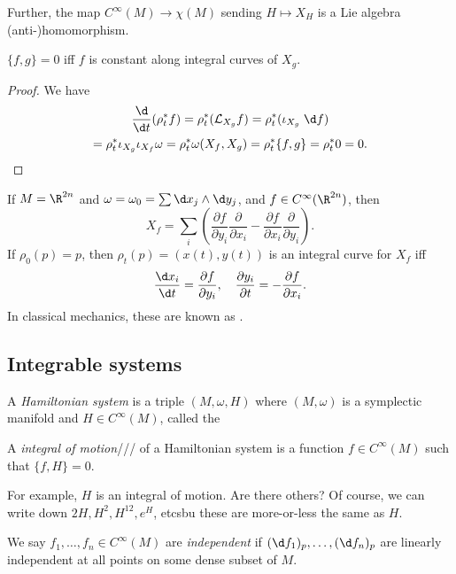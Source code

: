 \documentclass[a4paper]{article}
\begin{document}
Further, the map $C^\infty(M) \to \chi(M)$ sending $H \mapsto X_H$ is a Lie algebra (anti-)homomorphism.

\begin{prop}
  $\{f, g\} = 0$ iff $f$ is constant along integral curves of $X_g$.
\end{prop}

\begin{proof}
  We have
  \begin{multline*}
    \frac{\d}{\d t} (\rho_t^* f) = \rho_t^* (\mathcal{L}_{X_g} f) = \rho_t^* (\iota_{X_g}\;\d f) \\
    = \rho_t^* \iota_{X_g} \iota_{X_f} \omega = \rho_t^* \omega(X_f, X_g) = \rho_t^* \{f, g\} = \rho_t^* 0 = 0.%
  \end{multline*}
\end{proof}

\begin{eg}
  If $M = \R^{2n}$ and $\omega = \omega_0 = \sum \d x_j \wedge \d y_j$, and $f \in C^\infty(\R^{2n})$, then
  \[
    X_f = \sum_i \left(\frac{\partial f}{\partial y_i} \frac{\partial}{\partial x_i} - \frac{\partial f}{\partial x_i} \frac{\partial }{\partial y_i}\right).
  \]
  If $\rho_0(p) = p$, then $\rho_t(p) = (x(t), y(t))$ is an integral curve for $X_f$ iff
  \[
    \frac{\d x_i}{\d t} = \frac{\partial f}{\partial y_i},\quad \frac{\partial y_i}{\partial t} = -\frac{\partial f}{\partial x_i}.
  \]
  In classical mechanics, these are known as .
\end{eg}

\subsection{Integrable systems}
\begin{defi}
  A \emph{Hamiltonian system} is a triple $(M, \omega, H)$ where $(M, \omega)$ is a symplectic manifold and $H \in C^\infty(M)$, called the 
\end{defi}

\begin{defi}
  A \emph{integral of motion}/// of a Hamiltonian system is a function $f \in C^\infty(M)$ such that $\{f, H\} = 0$.
\end{defi}
For example, $H$ is an integral of motion. Are there others? Of course, we can write down $2H, H^2, H^{12}, e^H$, etcsbu these are more-or-less the same as $H$.
\begin{defi}
  We say $f_1, \ldots, f_n \in C^\infty(M)$ are \emph{independent} if $(\d f_1)_p, \ldots, (\d f_n)_p$ are linearly independent at all points on some dense subset of $M$.
\end{defi}
\end{document}

